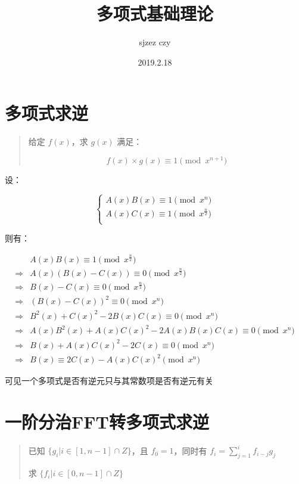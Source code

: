 \documentclass[UTF8]{article}
\author {sjzez czy}
\title {多项式基础理论}
\date{2019.2.18}
\begin{document}
\maketitle

\tableofcontents

\newpage

\section{多项式求逆}

\begin{quotation}
    给定 $f(x)$，求 $g(x)$ 满足：

    $$
    f(x) \times g(x) \equiv 1 \pmod {x^{n+1}}
    $$
\end{quotation}

设：

$$
\begin{cases}
A(x)B(x) \equiv 1 \pmod {x^n} \\
A(x)C(x) \equiv 1 \pmod {x^\frac{n}{2}} \\
\end{cases}
$$

则有：

$$
\begin{aligned}
& A(x)B(x) \equiv 1 \pmod {x^{\frac{n}{2}}} \\
\Rightarrow &A(x)(B(x)-C(x)) \equiv 0 \pmod {x^{\frac{n}{2}}} \\
\Rightarrow &B(x)-C(x) \equiv 0 \pmod {x^{\frac{n}{2}}} \\
\Rightarrow &(B(x)-C(x))^2 \equiv 0 \pmod {x^n} \\
\Rightarrow &B^2(x)+C(x)^2-2B(x)C(x) \equiv 0 \pmod {x^n} \\
\Rightarrow &A(x)B^2(x)+A(x)C(x)^2-2A(x)B(x)C(x) \equiv 0 \pmod {x^n} \\
\Rightarrow &B(x)+A(x)C(x)^2-2C(x) \equiv 0 \pmod {x^n} \\
\Rightarrow &B(x) \equiv 2C(x)-A(x)C(x)^2 \pmod {x^n}
\end{aligned}
$$

可见一个多项式是否有逆元只与其常数项是否有逆元有关

\section{一阶分治FFT转多项式求逆}

\begin{quotation}

    已知 $\{g_{i} | i \in [1,n-1] \cap Z\}$，且 $f_0=1$，同时有 $f_i=\sum_{j=1}^{i}f_{i-j}g_j$

    求 $\{ f_i | i \in [0,n - 1] \cap Z \}$
\end{quotation}
\end{document}
